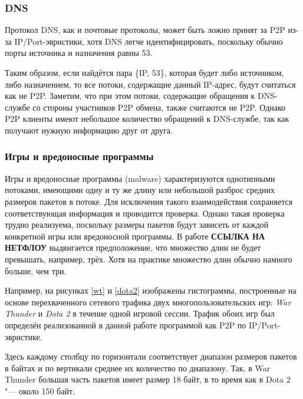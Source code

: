 \documentclass[bachelor, och, coursework]{SCWorks}
\begin{document}
\subsubsection{DNS}
Протокол DNS, как и почтовые протоколы, может быть ложно принят за P2P из-за IP/Port-эвристики, хотя DNS легче идентифицировать, поскольку обычно порты источника и назначения равны 53. 

Таким образом, если найдётся пара \{IP, 53\}, которая будет либо источником, либо назначением, то все потоки, содержащие данный IP-адрес, будут считаться как не P2P. Заметим, что при этом потоки,
содержащие обращения к DNS-службе со стороны участников P2P обмена, также считаются
не P2P. Однако P2P клиенты имеют небольшое количество обращений к DNS-службе, так
как получают нужную информацию друг от друга.

\subsubsection{Игры и вредоносные программы}
Игры и вредоносные программы (malware) характеризуются однотипными потоками,
имеющими одну и ту же длину или небольшой разброс средних размеров пакетов в потоке. Для исключения такого взаимодействия сохраняется соответствующая информация и проводится проверка. Однако такая проверка трудно реализуема, поскольку размеры пакетов будут зависеть от каждой конкретной игры или вредоносной программы. В работе \textbf{ССЫЛКА НА НЕТФЛОУ} выдвигается предположение, что множество длин не будет превышать, например, трёх. Хотя на практике множество длин обычно намного больше, чем три. 

Например, на рисунках \ref{wt} и \ref{dota2} изображены гистограммы, построенные на основе перехваченного сетевого трафика двух многопользовательских игр: \textit{War Thunder} и \textit{Dota 2} в течение одной игровой сессии. Трафик обоих игр был определён реализованной в данной работе программой как P2P по IP/Port-эвристике. 

Здесь каждому столбцу по горизонтали соответствует диапазон размеров пакетов в байтах и по вертикали среднее их количество по диапазону. Так, в War Thunder большая часть пакетов имеет размер 18 байт, в то время как в Dota 2 "--- около 150 байт. 
\end{document}
